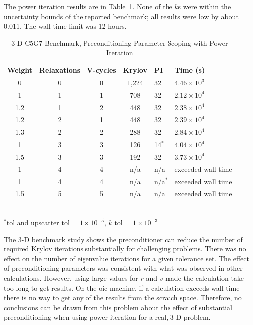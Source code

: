 The power iteration results are in Table~\ref{table:3-D c5g7}. None of the $k$s were within the uncertainty bounds of the reported benchmark; all results were low by about 0.011. The wall time limit was 12 hours. 
%
\begin{table}[!h]
\caption{3-D C5G7 Benchmark, Preconditioning Parameter Scoping with Power Iteration}
\begin{center}
\begin{tabular}{| c | c | c | c | l | l |}
\hline
Weight & Relaxations & V-cycles & Krylov & PI & Time (s) \\[0.5ex]
\hline
0    & 0 & 0 & 1,224 & 32 & $4.46 \times 10^{3}$ \\
1    & 1 & 1 & 708    & 32 & $2.12 \times 10^{4}$ \\
1.2 & 1 & 2 & 448    & 32 & $2.38 \times 10^{4}$ \\
1.2 & 2 & 1 & 448    & 32 & $2.39 \times 10^{4}$ \\
1.3 & 2 & 2 & 288    & 32 & $2.84 \times 10^{4}$ \\
1    & 3 & 3 & 126    & 14$^{*}$  & $4.04 \times 10^{4}$ \\
1.5 & 3 & 3 & 192    & 32 & $3.73 \times 10^{4}$ \\
1    & 4 & 4 & n/a     & n/a          & exceeded wall time \\
1    & 4 & 4 & n/a     & n/a$^{*}$ & exceeded wall time \\
1.5 & 5 & 5 & n/a     & n/a          & exceeded wall time \\
\hline 
\end{tabular}\\
$^{*}$tol and upscatter tol = $1 \times 10^{-5}$, $k$ tol = $1 \times 10^{-3}$
\end{center}
\label{table:3-D c5g7}
\end{table}

The 3-D benchmark study shows the preconditioner can reduce the number of required Krylov iterations substantially for challenging problems. There was no effect on the number of eigenvalue iterations for a given tolerance set. The effect of preconditioning parameters was consistent with what was observed in other calculations. However, using large values for $r$ and $v$ made the calculation take too long to get results. On the oic machine, if a calculation exceeds wall time there is no way to get any of the results from the scratch space. Therefore, no conclusions can be drawn from this problem about the effect of substantial preconditioning when using power iteration for a real, 3-D problem. 

